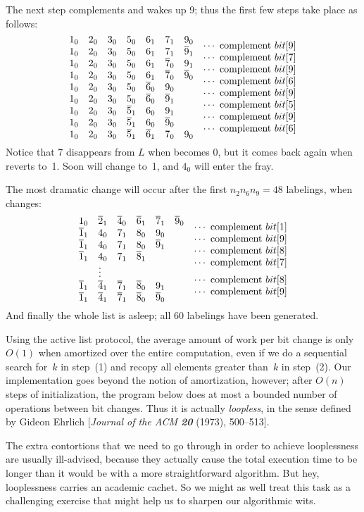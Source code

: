 The next step complements  and wakes up 9; thus the first
few steps take place as follows:
$$\vbox{\halign{$#\hfil$&
\quad\smash{\lower.5\baselineskip\hbox{$\cdots$ complement $\bit#$\hfil}}\cr
1_0\quad 2_0\quad 3_0\quad 5_0\quad 6_1\quad 7_1\quad 9_0&9\cr
1_0\quad 2_0\quad 3_0\quad 5_0\quad 6_1\quad 7_1\quad \p9_1&7\cr
1_0\quad 2_0\quad 3_0\quad 5_0\quad 6_1\quad \p7_0\quad 9_1&9\cr
1_0\quad 2_0\quad 3_0\quad 5_0\quad 6_1\quad \p7_0\quad \p9_0&6\cr
1_0\quad 2_0\quad 3_0\quad 5_0\quad \p6_0\quad 9_0&9\cr
1_0\quad 2_0\quad 3_0\quad 5_0\quad \p6_0\quad \p9_1&5\cr
1_0\quad 2_0\quad 3_0\quad \p5_1\quad 6_0\quad 9_1&9\cr
1_0\quad 2_0\quad 3_0\quad \p5_1\quad 6_0\quad \p9_0&6\cr
1_0\quad 2_0\quad 3_0\quad \p5_1\quad \p6_1\quad 7_0\quad 9_0\cr}}$$
Notice that 7 disappears from $L$ when  becomes 0, but it
comes back again when  reverts to~1. Soon  will
change to~1, and $4_0$ will enter the fray.

The most dramatic change will occur after the first $n_2n_6n_9=48$ labelings,
when  changes:
$$\vbox{\halign{$#\hfil$&
\quad\smash{\lower.5\baselineskip\hbox{$\cdots$ complement $\bit#$\hfil}}\cr
1_0\quad \p2_1\quad \p4_0\quad \p6_1\quad \p7_1\quad \p9_0&1\cr
\p1_1\quad 4_0\quad 7_1\quad 8_0\quad 9_0&9\cr
\p1_1\quad 4_0\quad 7_1\quad 8_0\quad \p9_1&8\cr
\p1_1\quad 4_0\quad 7_1\quad \p8_1&7\cr
\qquad\vdots&8\cr
\p1_1\quad \p4_1\quad \p7_1\quad \p8_0\quad 9_1&9\cr
\p1_1\quad \p4_1\quad \p7_1\quad \p8_0\quad \p9_0\cr}}$$
And finally the whole list is asleep; all 60 labelings have been generated.

\fi

Using the active list protocol, the average amount of work
per bit change is
only $O(1)$ when amortized over the entire computation, even if we do a
sequential search for~$k$ in step~(1) and recopy all elements greater than~$k$
in step~(2). Our implementation goes beyond the notion of amortization,
however; after $O(n)$ steps of initialization, the program below does at most
a bounded number of operations between bit changes. Thus it is actually {\it
loopless}, in the sense defined by Gideon Ehrlich [{\sl Journal of the ACM\/
\bf20} (1973), 500--513].

The extra contortions that we need to go through in order to achieve
looplessness are usually ill-advised, because they actually cause the
total execution time to be longer than it would be with a more straightforward
algorithm. But hey, looplessness carries an academic cachet.
So we might as well treat this task as a
challenging exercise that might help us to sharpen our algorithmic wits.

